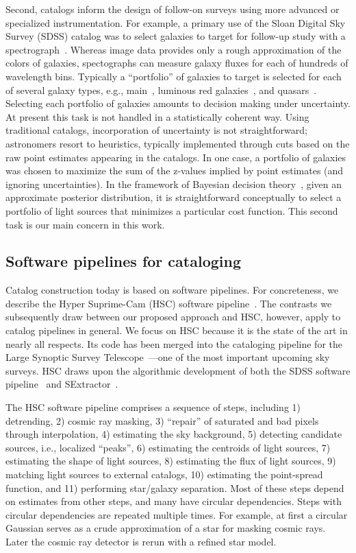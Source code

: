 Second, catalogs inform the design of follow-on surveys using more advanced or specialized instrumentation.
For example, a primary use of the Sloan Digital Sky Survey (SDSS) catalog was to select galaxies to target for follow-up study with a spectrograph~\citep{york2000sloan}.
Whereas image data provides only a rough approximation of the colors of galaxies, spectographs can measure galaxy fluxes for each of hundreds of wavelength bins.
Typically a ``portfolio'' of galaxies to target is selected for each of several galaxy types, e.g., main~\citep{strauss2002spectroscopic}, luminous red galaxies~\citep{eisenstein2001spectroscopic}, and quasars~\citep{richards2002spectroscopic}.
Selecting each portfolio of galaxies amounts to decision making under uncertainty. At present this task is not handled in a statistically coherent way.
Using traditional catalogs, incorporation of uncertainty is not straightforward; astronomers resort to heuristics, typically implemented through cuts based on the raw point estimates appearing in the catalogs. In one case, a portfolio of galaxies was chosen to maximize the sum of the z-values implied by point estimates (and ignoring uncertainties).
In the framework of Bayesian decision theory~\citep{berger2013statistical}, given an approximate posterior distribution, it is straightforward conceptually to select a portfolio of light sources that minimizes a particular cost function.
This second task is our main concern in this work.


\subsection*{Software pipelines for cataloging}

Catalog construction today is based on software pipelines.
For concreteness, we describe the Hyper Suprime-Cam (HSC) software pipeline~\citep{bosch2018hyper}.
The contrasts we subsequently draw between our proposed approach and HSC, however, apply to catalog pipelines in general.
We focus on HSC because it is the state of the art in nearly all respects.
Its code has been merged into the cataloging pipeline for the Large Synoptic Survey Telescope~\citep{lsst}---one of the most important upcoming sky surveys.
HSC draws upon the algorithmic development of both the SDSS software pipeline~\citep{lupton2001sdss}
and SExtractor~\citep{bertin1996sextractor}.

The HSC software pipeline comprises a sequence of steps, including 1) detrending, 2) cosmic ray masking, 3) ``repair'' of saturated and bad pixels through interpolation,
4) estimating the sky background, 5) detecting candidate sources, i.e., localized ``peaks'', 6) estimating the centroids of light sources, 7) estimating the shape of light sources,
8) estimating the flux of light sources, 9) matching light sources to external catalogs,
10) estimating the point-spread function, and 11) performing star/galaxy separation.
Most of these steps depend on estimates from other steps, and many have circular dependencies.
Steps with circular dependencies are repeated multiple times.
For example, at first a circular Gaussian serves as a crude approximation of a star for masking cosmic rays.
Later the cosmic ray detector is rerun with a refined star model.

